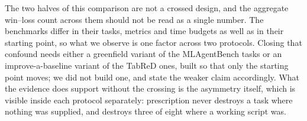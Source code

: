 The two halves of this comparison are not a crossed design, and the aggregate
win--loss count across them should not be read as a single number. The
benchmarks differ in their tasks, metrics and time budgets as well as in their
starting point, so what we observe is one factor across two protocols. Closing
that confound needs either a greenfield variant of the MLAgentBench tasks or an
improve-a-baseline variant of the TabReD ones, built so that only the starting
point moves; we did not build one, and state the weaker claim accordingly. What
the evidence does support without the crossing is the asymmetry itself, which is
visible inside each protocol separately: prescription never destroys a task where
nothing was supplied, and destroys three of eight where a working script was.
